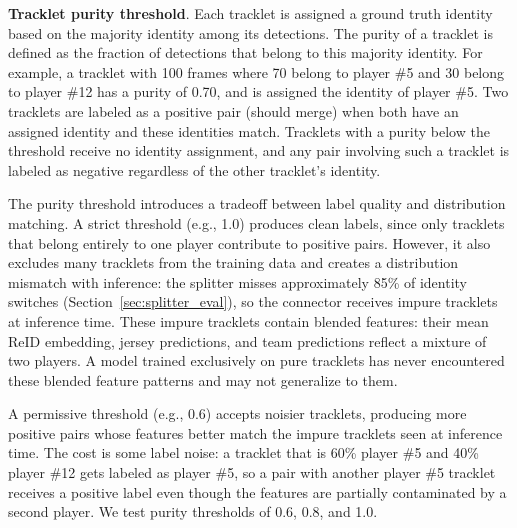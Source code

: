 
    \item \textbf{Tracklet purity threshold}. Each tracklet is assigned a ground truth identity based on the majority identity among its detections. The purity of a tracklet is defined as the fraction of detections that belong to this majority identity. For example, a tracklet with 100 frames where 70 belong to player \#5 and 30 belong to player \#12 has a purity of 0.70, and is assigned the identity of player \#5. Two tracklets are labeled as a positive pair (should merge) when both have an assigned identity and these identities match. Tracklets with a purity below the threshold receive no identity assignment, and any pair involving such a tracklet is labeled as negative regardless of the other tracklet's identity.

    The purity threshold introduces a tradeoff between label quality and distribution matching. A strict threshold (e.g., 1.0) produces clean labels, since only tracklets that belong entirely to one player contribute to positive pairs. However, it also excludes many tracklets from the training data and creates a distribution mismatch with inference: the splitter misses approximately 85\% of identity switches (Section~\ref{sec:splitter_eval}), so the connector receives impure tracklets at inference time. These impure tracklets contain blended features: their mean ReID embedding, jersey predictions, and team predictions reflect a mixture of two players. A model trained exclusively on pure tracklets has never encountered these blended feature patterns and may not generalize to them.

    A permissive threshold (e.g., 0.6) accepts noisier tracklets, producing more positive pairs whose features better match the impure tracklets seen at inference time. The cost is some label noise: a tracklet that is 60\% player \#5 and 40\% player \#12 gets labeled as player \#5, so a pair with another player \#5 tracklet receives a positive label even though the features are partially contaminated by a second player. We test purity thresholds of 0.6, 0.8, and 1.0.
